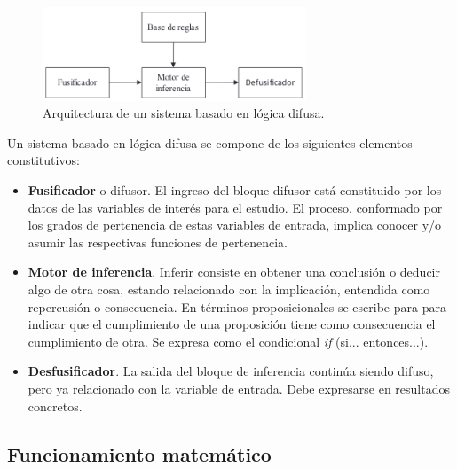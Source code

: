 \documentclass[a4paper, 11pt, titlepage]{article}
\begin{document}
        \begin{figure}[htp]
            \centering
            \includegraphics[width=0.7\textwidth]{resources/logicadifusa.png}
            \caption{Arquitectura de un sistema basado en lógica difusa.}
            \label{logicadifusa}
        \end{figure}

        Un sistema basado en lógica difusa se compone de los siguientes elementos constitutivos:

        \begin{itemize}
            \item \textbf{Fusificador} o difusor. El ingreso del bloque difusor está constituido por los 
            datos de las variables de interés para el estudio. El proceso, conformado por 
            los grados de pertenencia de estas variables de entrada, implica conocer y/o 
            asumir las respectivas funciones de pertenencia.
            \item \textbf{Motor de inferencia}. Inferir consiste en obtener una conclusión 
            o deducir algo de otra cosa, estando relacionado con la implicación, entendida como 
            repercusión o consecuencia. En términos proposicionales se escribe para para indicar 
            que el cumplimiento de una proposición tiene como consecuencia el cumplimiento de otra.
            Se expresa como el condicional \textit{if} (si... entonces...).
            \item \textbf{Desfusificador}. La salida del bloque de inferencia continúa siendo difuso,
            pero ya relacionado con la variable de entrada. Debe expresarse en resultados concretos.
        \end{itemize}

    \subsection{Funcionamiento matemático}
\end{document}
